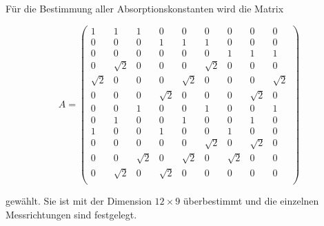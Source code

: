 \begin{flushleft}
Für die Bestimmung aller Absorptionskonstanten wird die Matrix 
\end{flushleft}
\begin{equation}
    \label{eqn:lul}
A = 
\begin{pmatrix}
    1 & 1 & 1 & 0 & 0 & 0 & 0 & 0 & 0 \\
    0 & 0 & 0 & 1 & 1 & 1 & 0 & 0 & 0 \\
    0 & 0 & 0 & 0 & 0 & 0 & 1 & 1 & 1 \\
    0 & \sqrt{2} & 0 & 0 & 0 & \sqrt{2} & 0 & 0 & 0 \\
    \sqrt{2} & 0 & 0 & 0 & \sqrt{2} & 0 & 0 & 0 & \sqrt{2} \\
    0 & 0 & 0 & \sqrt{2} & 0 & 0 & 0 & \sqrt{2} & 0 \\
    0 & 0 & 1 & 0 & 0 & 1 & 0 & 0 & 1 \\
    0 & 1 & 0 & 0 & 1 & 0 & 0 & 1 & 0 \\
    1 & 0 & 0 & 1 & 0 & 0 & 1 & 0 & 0 \\
    0 & 0 & 0 & 0 & 0 & \sqrt{2} & 0 & \sqrt{2} & 0 \\
    0 & 0 & \sqrt{2} & 0 & \sqrt{2} & 0 & \sqrt{2} & 0 & 0 \\
    0 & \sqrt{2} & 0 & \sqrt{2} & 0 & 0 & 0 & 0 & 0 \\
\end{pmatrix}
\end{equation}
\begin{flushleft}
gewählt. Sie ist mit der Dimension $12 \times 9$ überbestimmt und die einzelnen Messrichtungen sind festgelegt.
\end{flushleft}